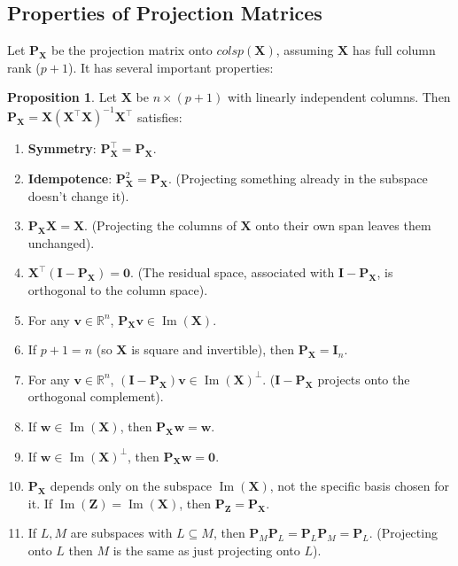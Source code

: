 \documentclass[11pt, letterpaper]{article}
\theoremstyle{definition}
\newtheorem{proposition}{Proposition}[section]
\newcommand{\R}{\mathbb{R}}
\newcommand{\mat}[1]{\mathbf{#1}} %
\newcommand{\vect}[1]{\mathbf{#1}} %
\DeclareMathOperator{\im}{Im}       %
\begin{document}
\subsection{Properties of Projection Matrices}

Let $\mat{P}_{\mat{X}}$ be the projection matrix onto $colsp(\mat{X})$, assuming $\mat{X}$ has full column rank ($p+1$). It has several important properties:

\begin{proposition} Let $\mat{X}$ be $n \times (p+1)$ with linearly independent columns. Then $\mat{P}_{\mat{X}} = \mat{X}(\mat{X}^{\top}\mat{X})^{-1}\mat{X}^{\top}$ satisfies:
\begin{enumerate}
    \item \textbf{Symmetry}: $\mat{P}_{\mat{X}}^{\top} = \mat{P}_{\mat{X}}$.
    \item \textbf{Idempotence}: $\mat{P}_{\mat{X}}^2 = \mat{P}_{\mat{X}}$. (Projecting something already in the subspace doesn't change it).
    \item $\mat{P}_{\mat{X}}\mat{X} = \mat{X}$. (Projecting the columns of $\mat{X}$ onto their own span leaves them unchanged).
    \item $\mat{X}^{\top}(\mat{I} - \mat{P}_{\mat{X}}) = \mat{0}$. (The residual space, associated with $\mat{I}-\mat{P}_{\mat{X}}$, is orthogonal to the column space).
    \item For any $\vect{v} \in \R^n$, $\mat{P}_{\mat{X}}\vect{v} \in \im(\mat{X})$.
    \item If $p+1=n$ (so $\mat{X}$ is square and invertible), then $\mat{P}_{\mat{X}} = \mat{I}_n$.
    \item For any $\vect{v} \in \R^n$, $(\mat{I} - \mat{P}_{\mat{X}})\vect{v} \in \im(\mat{X})^{\perp}$. ($\mat{I}-\mat{P}_{\mat{X}}$ projects onto the orthogonal complement).
    \item If $\vect{w} \in \im(\mat{X})$, then $\mat{P}_{\mat{X}}\vect{w} = \vect{w}$.
    \item If $\vect{w} \in \im(\mat{X})^{\perp}$, then $\mat{P}_{\mat{X}}\vect{w} = \vect{0}$.
    \item $\mat{P}_{\mat{X}}$ depends only on the subspace $\im(\mat{X})$, not the specific basis chosen for it. If $\im(\mat{Z}) = \im(\mat{X})$, then $\mat{P}_{\mat{Z}} = \mat{P}_{\mat{X}}$.
    \item If $L, M$ are subspaces with $L \subseteq M$, then $\mat{P}_M \mat{P}_L = \mat{P}_L \mat{P}_M = \mat{P}_L$. (Projecting onto $L$ then $M$ is the same as just projecting onto $L$).
\end{enumerate}
\end{proposition}
\end{document}
